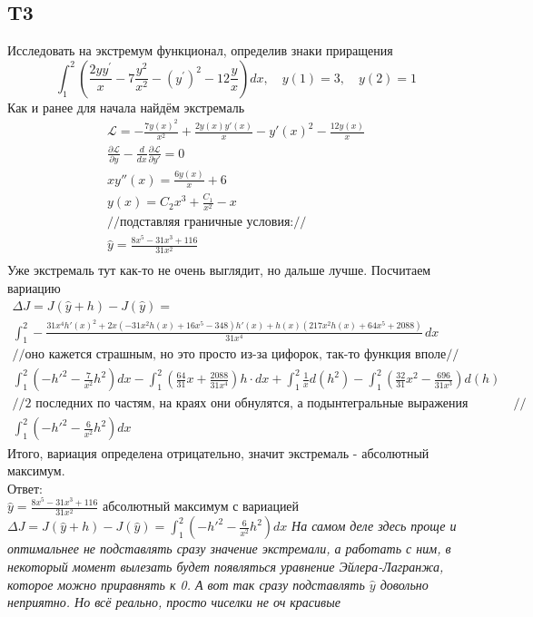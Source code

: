\documentclass{article}
\newcommand{\Lagr}{\mathcal{L}}
\begin{document}
\subsection{T3}
Исследовать на экстремум функционал, определив знаки приращения
\begin{equation}
    \int_{1}^{2}\left(\frac{2 y y^{\prime}}{x}-7 \frac{y^{2}}{x^{2}}-\left(y^{\prime}\right)^{2}-12 \frac{y}{x}\right) d x, \quad y(1)=3, \quad y(2)=1
\end{equation}
Как и ранее для начала найдём экстремаль
\begin{gather*}
    \Lagr =-\frac{7 y(x)^2}{x^2}+\frac{2 y(x) y'(x)}{x}-y'(x)^2-\frac{12 y(x)}{x}\\
    \frac{\partial \Lagr}{\partial y}  - \frac{d }{d x} \frac{\partial \Lagr}{\partial y'} =0   \\
    x y''(x)=\frac{6 y(x)}{x}+6\\
    y(x) = C_2 x^3+\frac{C_1}{x^2}-x\\
    //\text{подставляя граничные условия:}//\\
    \hat y=\frac{8 x^5-31 x^3+116}{31 x^2}\\
\end{gather*}
Уже экстремаль тут как-то не очень выглядит, но дальше лучше. Посчитаем вариацию
\begin{gather*}
    \Delta J = J(\hat y + h) - J(\hat y) = \\
    \int_1^2 -\frac{31 x^4 h'(x)^2+2 x \left(-31 x^2 h(x)+16 x^5-348\right) h'(x)+h(x) \left(217 x^2 h(x)+64 x^5+2088\right)}{31 x^4} \, dx\\
    //\text{оно кажется страшным, но это просто из-за цифорок, так-то функция вполе}//\\
    \int_1^2 \left( -h'^2 -\frac{7}{x^2}h^2 \right)dx -
    \int_1^2 \left(\frac{64}{31}x + \frac{2088}{31x^4} \right)h \cdot dx +
    \int_1^2 \frac{1}{x} d(h^2) -
    \int_1^2 \left( \frac{32}{31} x^2 -\frac{696}{31x^3}\right)d(h)\\
    //\text{2 последних по частям, на краях они обнулятся, а подынтегральные выражения сократятся}//\\
    \int_1^2 \left(-h'^2  - \frac{6}{x^2}h^2 \right)dx
\end{gather*}
Итого, вариация определена отрицательно, значит экстремаль - абсолютный максимум.\\
Ответ: \\
$\hat y = \frac{8 x^5-31 x^3+116}{31 x^2}$  абсолютный максимум с вариацией $\Delta J = J(\hat y + h) - J(\hat y) =\int_1^2 \left(-h'^2  - \frac{6}{x^2}h^2\right)dx$
 \textcolor[rgb]{0.480469,0.566406,0.480469}{\textit{На самом деле здесь проще и оптимальнее не подставлять сразу значение экстремали, а работать с ним, в некоторый момент вылезать будет появляться уравнение Эйлера-Лагранжа, которое можно приравнять к 0. А вот так сразу подставлять $\hat y$ довольно неприятно. Но всё реально, просто чиселки не оч красивые}}                                               
\end{document}
